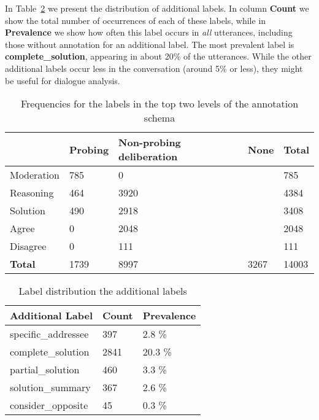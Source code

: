 \documentclass[acmsmall,manuscript,screen]{acmart}
\begin{document}
In Table~\ref{table:additional_distribution} we present the distribution of additional labels. In column \textbf{Count} we show the total number of occurrences of each of these labels, while in \textbf{Prevalence} we show how often this label occurs in \textit{all} utterances, including those without annotation for an additional label. The most prevalent label is \textbf{complete\_solution}, appearing in about 20\% of the utterances. While the other additional labels occur less in the conversation (around 5\% or less), they might be useful for dialogue analysis.

\begin{table}[t!]

\centering
    \begin{tabular}{|l||l|l|l||l|}
    \hline 
    \textbf{} & \textbf{Probing} & \multicolumn{1}{|p{2cm}|}{\centering \textbf{Non-probing deliberation}} & \textbf{None} & \textbf{Total} \\
\hline \hline 
    Moderation & 785 & 0 & & 785 \\ \hline 
    Reasoning & 464 & 3920 & & 4384 \\ \hline 
    Solution & 490 & 2918 & & 3408 \\ \hline 
    Agree & 0 & 2048 & & 2048 \\ \hline 
    Disagree & 0 & 111 & & 111 \\ \hline \hline 
    \textbf{Total} & 1739 & 8997 & 3267 & 14003 \\ \hline
\end{tabular}
\caption{Frequencies for the labels in the top two levels of the annotation schema}
\label{table:annotated_distribution}
\end{table} 



\begin{table}[t!]
\centering
    \begin{tabular}{|l|l|l|}
    \hline 
    \textbf{Additional Label} & \textbf{Count} & \textbf{Prevalence} \\
\hline \hline 
    specific\_addressee & 397 & 2.8 \% \\ \hline 
    complete\_solution & 2841 & 20.3 \% \\ \hline 
    partial\_solution  & 460 & 3.3 \% \\ \hline 
    solution\_summary & 367 & 2.6 \% \\ \hline 
    consider\_opposite & 45 & 0.3 \% \\ \hline 
\end{tabular}
\caption{Label distribution the additional labels}
\label{table:additional_distribution}
\end{table}
\end{document}
